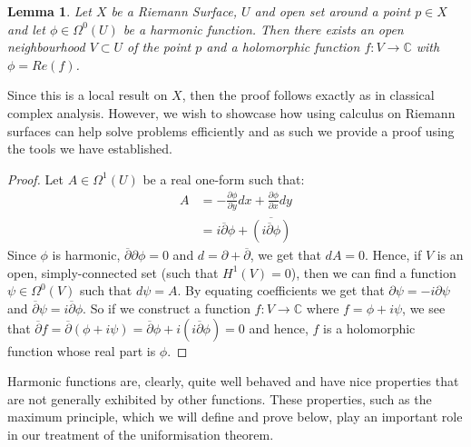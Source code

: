 \documentclass[11pt]{report}
\newtheorem{lemma}[thm]{Lemma}
\theoremstyle{definition}
\begin{document}
\begin{lemma}\label{HarmRealHol}
  Let $X$ be a Riemann Surface, $U$ and open set around a point $p \in X$ and let $\phi \in \Omega^0(U)$ be a harmonic function. Then there exists an open neighbourhood $V \subset U$ of the point $p$ and a holomorphic function $f \colon V \rightarrow \mathbb{C}$ with $\phi = Re(f)$.
\end{lemma}
Since this is a local result on $X$, then the proof follows exactly as in classical complex analysis. However, we wish to showcase how using calculus on Riemann surfaces can help solve problems efficiently and as such we provide a proof using the tools we have established.
\begin{proof}
  Let $A \in \Omega^1(U)$ be a real one-form such that: 
  \begin{align*}
    A &= -\frac{\partial \phi}{\partial y} dx + \frac{\partial \phi}{\partial x} dy \\ &= i\overline{\partial}\phi + \overline{(i\overline{\partial}\phi)}
  \end{align*}
  Since $\phi$ is harmonic, $\overline{\partial}\partial \phi = 0$ and $d = \partial + \overline{\partial}$, we get that $dA = 0$. Hence, if $V$ is an open, simply-connected set (such that $H^1(V)=0$), then we can find a function $\psi \in \Omega^0(V)$ such that $d\psi = A$. By equating coefficients we get that $\partial \psi = -i \partial \psi$ and $\overline{\partial} \psi = i \overline{\partial} \phi$. So if we construct a function $f \colon V \rightarrow \mathbb{C}$ where $f = \phi + i \psi$, we see that $\overline{\partial}f = \overline{\partial}(\phi + i\psi) = \overline{\partial}\phi +i(i\overline{\partial}\phi) = 0$ and hence, $f$ is a holomorphic function whose real part is $\phi$. 
\end{proof}

Harmonic functions are, clearly, quite well behaved and have nice properties that are not generally exhibited by other functions. These properties, such as the maximum principle, which we will define and prove below, play an important role in our treatment of the uniformisation theorem.
\end{document}
